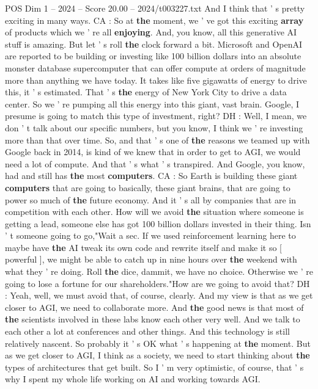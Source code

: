 \begin{textsample}{POS Dim 1 – 2024 – Score 20.00 – 2024/t003227.txt}
And I think that ' s pretty exciting in many ways.
CA : So at \textbf{the} moment, we ' ve got this exciting \textbf{array} of products which we ' re all \textbf{enjoying}.
And, you know, all this generative AI stuff is amazing.
But let ' s roll \textbf{the} clock forward a bit.
Microsoft and OpenAI are reported to be building or investing like 100 billion dollars into an absolute monster database supercomputer that can offer compute at orders of magnitude more than anything we have today.
It takes like five gigawatts of energy to drive this, it ' s estimated.
That ' s \textbf{the} energy of New York City to drive a data center.
So we ' re pumping all this energy into this giant, vast brain.
Google, I presume is going to match this type of investment, right?
DH : Well, I mean, we don ' t talk about our specific numbers, but you know, I think we ' re investing more than that over time.
So, and that ' s one of \textbf{the} reasons we teamed up with Google back in 2014, is kind of we knew that in order to get to AGI, we would need a lot of compute.
And that ' s what ' s transpired.
And Google, you know, had and still has \textbf{the} most \textbf{computers}.
CA : So Earth is building these giant \textbf{computers} that are going to basically, these giant brains, that are going to power so much of \textbf{the} future economy.
And it ' s all by companies that are in competition with each other.
How will we avoid \textbf{the} situation where someone is getting a lead, someone else has got 100 billion dollars invested in their thing.
Isn ' t someone going to go,"Wait a sec.
If we used reinforcement learning here to maybe have \textbf{the} AI tweak its own code and rewrite itself and make it so [ powerful ], we might be able to catch up in nine hours over \textbf{the} weekend with what they ' re doing.
Roll \textbf{the} dice, dammit, we have no choice.
Otherwise we ' re going to lose a fortune for our shareholders."How are we going to avoid that?
DH : Yeah, well, we must avoid that, of course, clearly.
And my view is that as we get closer to AGI, we need to collaborate more.
And \textbf{the} good news is that most of \textbf{the} scientists involved in these labs know each other very well.
And we talk to each other a lot at conferences and other things.
And this technology is still relatively nascent.
So probably it ' s OK what ' s happening at \textbf{the} moment.
But as we get closer to AGI, I think as a society, we need to start thinking about \textbf{the} types of architectures that get built.
So I ' m very optimistic, of course, that ' s why I spent my whole life working on AI and working towards AGI.

\end{textsample}
